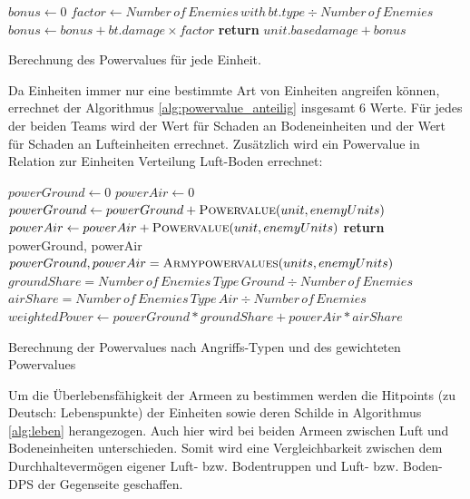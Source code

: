 \begin{algorithm}
\begin{algorithmic}[1]
	\State $bonus \leftarrow 0$
			\State $factor \leftarrow Number\,of\,Enemies\,with\,bt.type \div Number\,of\,Enemies$
			\State $bonus \leftarrow bonus + bt.damage \times factor$
		\EndIf
	\EndFor
	\State \textbf{return} $ unit.basedamage + bonus$
\EndProcedure
\end{algorithmic}
\caption{Berechnung des Powervalues für jede Einheit.}
\label{alg:powervalue}
\end{algorithm}

Da Einheiten immer nur eine bestimmte Art von Einheiten angreifen können, errechnet der Algorithmus \ref{alg:powervalue_anteilig} insgesamt 6 Werte. Für jedes der beiden Teams wird der Wert für Schaden an Bodeneinheiten und der Wert für Schaden an Lufteinheiten errechnet. Zusätzlich wird ein Powervalue in Relation zur Einheiten Verteilung Luft-Boden errechnet:
\begin{algorithm}
\begin{algorithmic}[1]
	\State $powerGround \leftarrow 0$
	\State $powerAir \leftarrow 0$
		\State $powerGround \leftarrow powerGround+\textsc{Powervalue}(unit, enemyUnits)$	
		\Else
			\State $powerAir \leftarrow powerAir+\textsc{Powervalue}(unit, enemyUnits)$	
		\EndIf	
	\EndFor
\State \textbf{return} powerGround, powerAir
\EndProcedure	
\State $powerGround, powerAir = \textsc{Armypowervalues}(units, enemyUnits)$
\State $groundShare = Number\,of\,Enemies\,Type\,Ground \div Number\,of\,Enemies$
\State $airShare = Number\,of\,Enemies\,Type\,Air \div Number\,of\,Enemies$
\State $weightedPower \leftarrow powerGround * groundShare + powerAir * airShare$ 
\end{algorithmic}
\caption{Berechnung der Powervalues nach Angriffs-Typen und des gewichteten Powervalues}
\label{alg:powervalue_anteilig}
\end{algorithm}



Um die Überlebensfähigkeit der Armeen zu bestimmen werden die Hitpoints (zu Deutsch: Lebenspunkte) der Einheiten sowie deren Schilde in Algorithmus \ref{alg:leben} herangezogen. Auch hier wird bei beiden Armeen zwischen Luft und Bodeneinheiten unterschieden. Somit wird eine Vergleichbarkeit zwischen dem Durchhaltevermögen eigener Luft- bzw. Bodentruppen und Luft- bzw. Boden-DPS der Gegenseite geschaffen.

